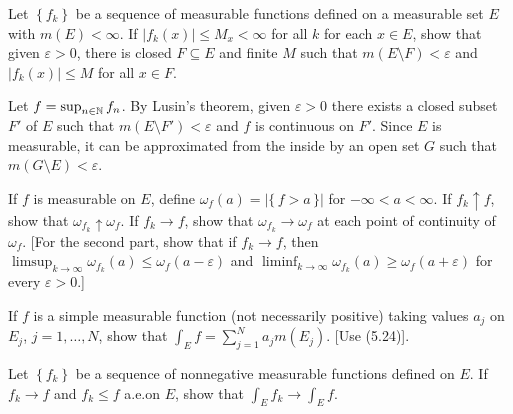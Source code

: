 \begin{problem}
  Let $\left\{f_k\right\}$ be a sequence of measurable functions defined on
  a measurable set $E$ with $m(E)<\infty$. If $|f_k(x)|\leq M_x<\infty$ for
  all $k$ for each $x\in E$, show that given $\varepsilon>0$, there is
  closed $F\subseteq E$ and finite $M$ such that
  $m(E\setminus F)<\varepsilon$ and $|f_k(x)|\leq M$ for all $x\in F$.
\end{problem}
\begin{solution}
  Let $f=\sup_{n\in\mathbb{N}}f_n$. By Lusin's theorem, given $\varepsilon>0$
  there exists a closed subset $F'$ of $E$ such that $m(E\setminus
  F')<\varepsilon$ and $f$ is continuous on $F'$. Since $E$ is measurable,
  it can be approximated from the inside by an open set $G$ such that
  $m(G\setminus E)<\varepsilon$.
\end{solution}

\begin{problem}
  If $f$ is measurable on $E$, define $\omega_f(a)=|\{\,f>a\,\}|$ for
  $-\infty<a<\infty$. If $f_k\uparrow f$, show that
  $\omega_{f_k}\uparrow\omega_f$. If $f_k\to f$, show that
  $\omega_{f_k}\to\omega_f$ at each point of continuity of $\omega_f$. [For
  the second part, show that if $f_k\to f$, then
  $\limsup_{k\to\infty}\omega_{f_k}(a)\leq\omega_f(a-\varepsilon)$ and
  $\liminf_{k\to\infty}\omega_{f_k}(a)\geq\omega_f(a+\varepsilon)$ for
  every $\varepsilon>0$.]
\end{problem}
\begin{solution}

\end{solution}

\begin{problem}
  If $f$ is a simple measurable function (not necessarily positive) taking
  values $a_j$ on $E_j$, $j=1,\ldots,N$, show that
  $\int_E f=\sum_{j=1}^N a_jm(E_j)$. [Use (5.24)].
\end{problem}
\begin{solution}
\end{solution}

\begin{problem}
  Let $\left\{f_k\right\}$ be a sequence of nonnegative measurable
  functions defined on $E$. If $f_k\to f$ and $f_k\leq f$ a.e.\@ on $E$,
  show that $\int_E f_k\to\int_E f$.
\end{problem}
\begin{solution}
\end{solution}

